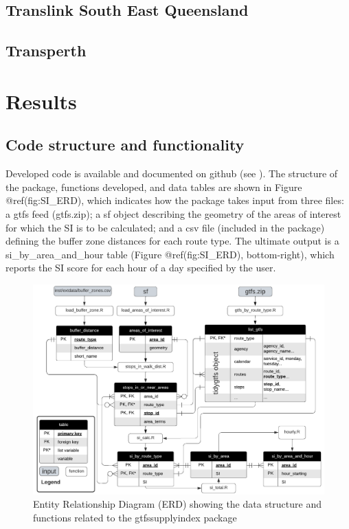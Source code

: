 \documentclass[preprint, 3p,
authoryear]{elsarticle} %
\begin{document}
\subsection{Translink South East
Queensland}\label{translink-south-east-queensland}

\subsection{Transperth}\label{transperth}

\section{Results}\label{results}

\subsection{Code structure and
functionality}\label{code-structure-and-functionality}

Developed code is available and documented on github (see
\citet{gtfssupplyindex_github}). The structure of the package, functions
developed, and data tables are shown in Figure @ref(fig:SI\_ERD), which
indicates how the package takes input from three files: a gtfs feed
(gtfs.zip); a sf object describing the geometry of the areas of interest
for which the SI is to be calculated; and a csv file (included in the
package) defining the buffer zone distances for each route type. The
ultimate output is a si\_by\_area\_and\_hour table (Figure
@ref(fig:SI\_ERD), bottom-right), which reports the SI score for each
hour of a day specified by the user.

\begin{figure}
\includegraphics[width=1\linewidth]{graphics/SI_data_structure} \caption{Entity Relationship Diagram (ERD) showing the data structure and functions related to the gtfssupplyindex package}\label{fig:SI_ERD}
\end{figure}
\end{document}
